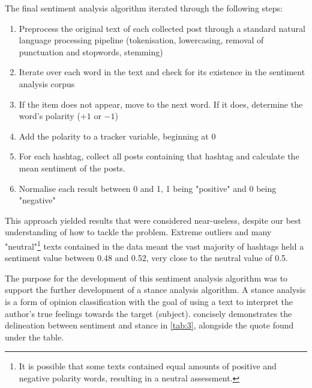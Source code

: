 \documentclass[a4paper,11pt]{article}  %
\begin{document}
	The final sentiment analysis algorithm iterated through the following steps:
	\begin{enumerate}
		\item Preprocess the original text of each collected post through a standard natural language processing pipeline (tokenisation, lowercasing, removal of punctuation and stopwords, stemming)
		\item Iterate over each word in the text and check for its existence in the sentiment analysis corpus
		\item If the item does not appear, move to the next word. If it does, determine the word's polarity ($+1$ or $-1$)
		\item Add the polarity to a tracker variable, beginning at 0
		\item For each hashtag, collect all posts containing that hashtag and calculate the mean sentiment of the posts. 
		\item Normalise each result between 0 and 1, 1 being "positive" and 0 being "negative"
	\end{enumerate}
	This approach yielded results that were considered near-useless, despite our best understanding of how to tackle the problem. Extreme outliers and many "neutral"\footnote{It is possible that some texts contained equal amounts of positive and negative polarity words, resulting in a neutral assessment.} texts contained in the data meant the vast majority of hashtags held a sentiment value between 0.48 and 0.52, very close to the neutral value of 0.5.

	The purpose for the development of this sentiment analysis algorithm was to support the further development of a stance analysis algorithm. A stance analysis is a form of opinion classification with the goal of using a text to interpret the author's true feelings towards the target (subject).
	\textcite{aldayelStanceDetectionSocial2021} concisely demonstrates the delineation between sentiment and stance in \autoref{tab:3}, alongside the quote found under the table.
\end{document}

